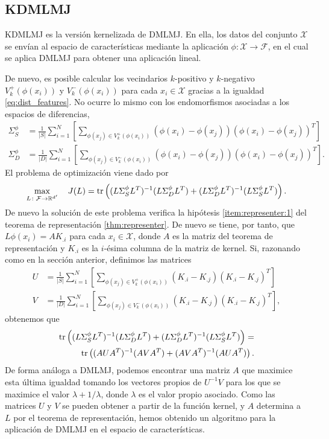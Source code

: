 \subsection{KDMLMJ}

KDMLMJ \cite{dmlmj} es la versión kernelizada de DMLMJ. En ella, los datos del conjunto $\mathcal{X}$ se envían al espacio de características mediante la aplicación $\phi\colon \mathcal{X} \to \mathcal{F}$, en el cual se aplica DMLMJ para obtener una aplicación lineal.

De nuevo, es posible calcular los vecindarios $k$-positivo y $k$-negativo $V_k^+(\phi(x_i))$ y $V_k^-(\phi(x_i))$ para cada $x_i \in \mathcal{X}$ gracias a la igualdad \ref{eq:dist_features}. No ocurre lo mismo con los endomorfismos asociadas a los espacios de diferencias,
\begin{align*}
    \Sigma_S^{\phi} &= \frac{1}{|S|}\sum_{i=1}^{N} \left[ \sum_{\phi(x_j) \in V_k^+(\phi(x_i))} (\phi(x_i)-\phi(x_j))(\phi(x_i)-\phi(x_j))^T\right] \\
    \Sigma_D^{\phi} &= \frac{1}{|D|}\sum_{i=1}^{N} \left[ \sum_{\phi(x_j) \in V_k^-(\phi(x_i))} (\phi(x_i)-\phi(x_j))(\phi(x_i)-\phi(x_j))^T\right].
\end{align*}
El problema de optimización viene dado por
\[ \max_{L \colon \mathcal{F} \to \mathbb{R}^{d'}} \quad J(L) =  \operatorname{tr}\left( (L\Sigma_S^{\phi} L^T)^{-1} (L\Sigma_D^{\phi} L^T) + (L \Sigma_D^{\phi} L^T)^{-1} (L \Sigma_S^{\phi} L^T) \right).\]
De nuevo la solución de este problema verifica la hipótesis \ref{item:representer:1} del teorema de representación \ref{thm:representer}. De nuevo se tiene, por tanto, que $L\phi(x_i) = AK_{.i}$ para cada $x_i \in \mathcal{X}$, donde $A$ es la matriz del teorema de representación y $K_{.i}$ es la $i$-ésima columna de la matriz de kernel. Si, razonando como en la sección anterior, definimos las matrices
\begin{align*}
    U &= \frac{1}{|S|}\sum_{i=1}^{N} \left[ \sum_{\phi(x_j) \in V_k^+(\phi(x_i))} (K_{.i}-K_{.j})(K_{.i}-K_{.j})^T\right] \\
    V &= \frac{1}{|D|}\sum_{i=1}^{N} \left[ \sum_{\phi(x_j) \in V_k^-(\phi(x_i))} (K_{.i}-K_{.j})(K_{.i}-K_{.j})^T\right],
\end{align*}
obtenemos que
\begin{equation*}
    \begin{split}
        \operatorname{tr}\left( (L\Sigma_S^{\phi} L^T)^{-1} (L\Sigma_D^{\phi} L^T) + (L \Sigma_D^{\phi} L^T)^{-1} (L \Sigma_S^{\phi} L^T) \right) = \\
        \operatorname{tr}\left( (AUA^T)^{-1} (AV A^T) + (A V A^T)^{-1} (A U A^T) \right).
    \end{split}
\end{equation*}
De forma análoga a DMLMJ, podemos encontrar una matriz $A$ que maximice esta última igualdad tomando los vectores propios de $U^{-1}V$ para los que se maximice el valor $\lambda + 1 /\lambda$, donde $\lambda$ es el valor propio asociado. Como las matrices $U$ y $V$ se pueden obtener a partir de la función kernel, y $A$ determina a $L$ por el teorema de representación, hemos obtenido un algoritmo para la aplicación de DMLMJ en el espacio de características.


